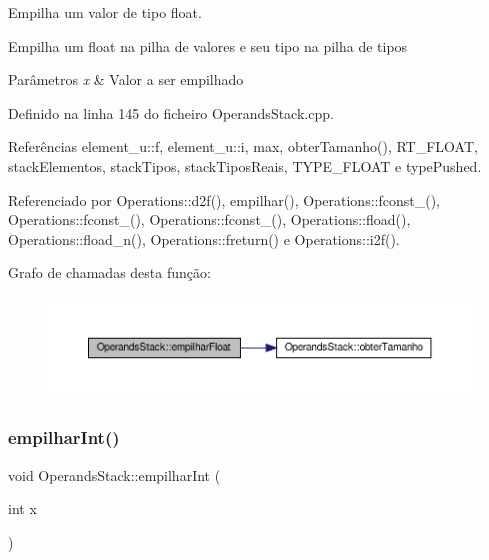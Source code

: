 Empilha um valor de tipo float. 

Empilha um float na pilha de valores e seu tipo na pilha de tipos


\begin{DoxyParams}{Parâmetros}
{\em x} & Valor a ser empilhado \\
\hline
\end{DoxyParams}


Definido na linha 145 do ficheiro Operands\+Stack.\+cpp.



Referências element\+\_\+u\+::f, element\+\_\+u\+::i, max, obter\+Tamanho(), R\+T\+\_\+\+F\+L\+O\+AT, stack\+Elementos, stack\+Tipos, stack\+Tipos\+Reais, T\+Y\+P\+E\+\_\+\+F\+L\+O\+AT e type\+Pushed.



Referenciado por Operations\+::d2f(), empilhar(), Operations\+::fconst\+\_(), Operations\+::fconst\+\_(), Operations\+::fconst\+\_(), Operations\+::fload(), Operations\+::fload\+\_\+n(), Operations\+::freturn() e Operations\+::i2f().

Grafo de chamadas desta função\+:
\nopagebreak
\begin{figure}[H]
\begin{center}
\leavevmode
\includegraphics[width=350pt]{classOperandsStack_aeed478b52748b87ac85db261332b633b_cgraph}
\end{center}
\end{figure}
\mbox{\label{classOperandsStack_a5006a59c2d815e4a24b055e2e4d2e741}} 
\subsubsection{\texorpdfstring{empilhar\+Int()}{empilharInt()}}
{\footnotesize\ttfamily void Operands\+Stack\+::empilhar\+Int (\begin{DoxyParamCaption}\item[{int}]{x }\end{DoxyParamCaption})}



